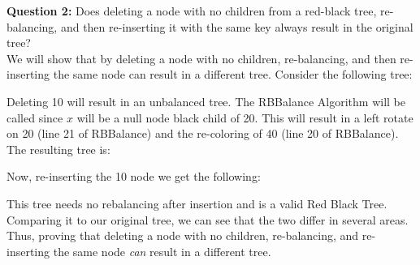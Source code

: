 \documentclass[12pt]{article}
\begin{document}
\begin{center}
\end{center}

\textbf{Question 2:} Does deleting a node with no children from a red-black tree, re-balancing, and then re-inserting it with the same key always result in the original tree? \\

\noindent
We will show that by deleting a node with no children, re-balancing, and then re-inserting the same node can result in a different tree. Consider the following tree: \\

\begin{center}
\end{center}
\noindent
Deleting 10 will result in an unbalanced tree. The RBBalance Algorithm will be called since $x$ will be a null node black child of 20. This will result in a left rotate on 20 (line 21 of RBBalance) and the re-coloring of 40 (line 20 of RBBalance). The resulting tree is: \\
\begin{center}
\end{center}
\noindent
Now, re-inserting the 10 node we get the following: \\
\begin{center}
\end{center}
\noindent
This tree needs no rebalancing after insertion and is a valid Red Black Tree. Comparing it to our original tree, we can see that the two differ in several areas. Thus, proving that deleting a node with no children, re-balancing, and re-inserting the same node \emph{can} result in a different tree.
\end{document}
